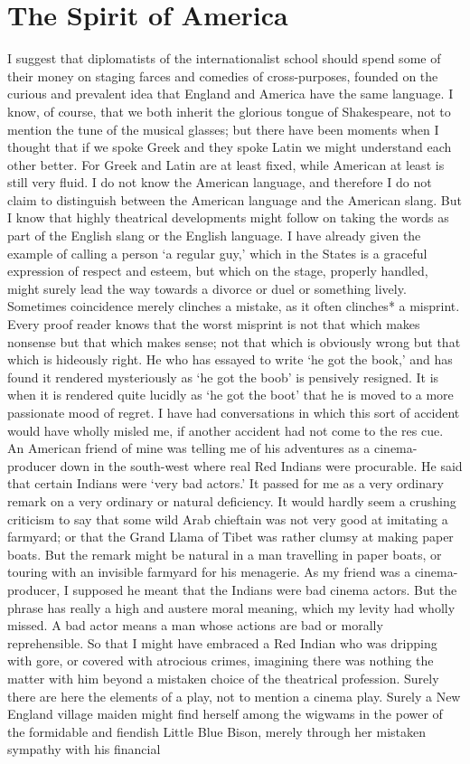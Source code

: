 \documentclass{book}
\begin{document}
\chapter{The Spirit of America}
\label{chapter-16}
I suggest that diplomatists of the internationalist school should spend some of their money on staging farces and comedies of cross-purposes, founded on the curious and prevalent idea that England and America have the same language. I know, of course, that we both inherit the glorious tongue of Shakespeare, not to mention the tune of the musical glasses; but there have been moments when I thought that if we spoke Greek and they spoke Latin we might understand each other better. For Greek and Latin are at least fixed, while American at least is still very fluid. I do not know the American language, and therefore I do not claim to distinguish between the American language and the American slang. But I know that highly theatrical developments might follow on taking the words as part of the English slang or the English language. I have already given the example of calling a person ‘a regular guy,’ which in the States is a graceful expression of respect and esteem, but which on the stage, properly handled, might surely lead the way towards a divorce or duel or something lively. Sometimes coincidence merely clinches a mistake, as it often clinches* a misprint. Every proof reader knows that the worst misprint is not that which makes nonsense but that which makes sense; not that which is obviously wrong but that which is hideously right. He who has essayed to write ‘he got the book,’ and has found it rendered mysteriously as ‘he got the boob’ is pensively resigned. It is when it is rendered quite lucidly as ‘he got the boot’ that he is moved to a more passionate mood of regret. I have had conversations in which this sort of accident would have wholly misled me, if another accident had not come to the res cue. An American friend of mine was telling me of his adventures as a cinema-producer down in the south-west where real Red Indians were procurable. He said that certain Indians were ‘very bad actors.’ It passed for me as a very ordinary remark on a very ordinary or natural deficiency. It would hardly seem a crushing criticism to say that some wild Arab chieftain was not very good at imitating a farmyard; or that the Grand Llama of Tibet was rather clumsy at making paper boats. But the remark might be natural in a man travelling in paper boats, or touring with an invisible farmyard for his menagerie. As my friend was a cinema-producer, I supposed he meant that the Indians were bad cinema actors. But the phrase has really a high and austere moral meaning, which my levity had wholly missed. A bad actor means a man whose actions are bad or morally reprehensible. So that I might have embraced a Red Indian who was dripping with gore, or covered with atrocious crimes, imagining there was nothing the matter with him beyond a mistaken choice of the theatrical profession. Surely there are here the elements of a play, not to mention a cinema play. Surely a New England village maiden might find herself among the wigwams in the power of the formidable and fiendish Little Blue Bison, merely through her mistaken sympathy with his financial 
\end{document}
